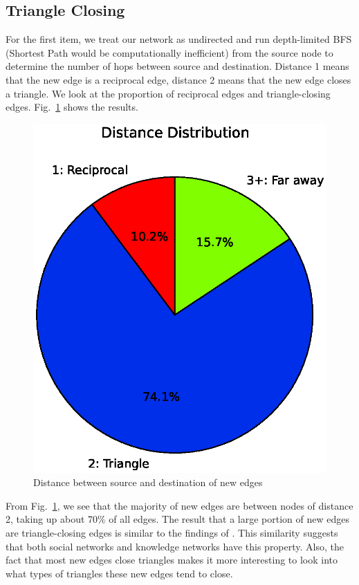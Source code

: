 \documentclass[10pt]{article}
\begin{document}
\begin{multicols}{2}
\subsection{Triangle Closing}
For the first item, we treat our network as undirected and run depth-limited BFS (Shortest Path would be computationally inefficient) from the source node to determine the number of hops between source and destination. Distance 1 means that the new edge is a reciprocal edge, distance 2 means that the new edge closes a triangle. We look at the proportion of reciprocal edges and triangle-closing edges. Fig.~\ref{fig:portion123} shows the results.
\begin{figure}[H]
    \centering
    \includegraphics[scale=0.4]{./graphs/distance_pie.eps}
    \caption{Distance between source and destination of new edges} \label{fig:portion123}
\end{figure}
From Fig.~\ref{fig:portion123}, we see that the majority of new edges are between nodes of distance 2, taking up about 70\% of all edges. The result that a large portion of new edges are triangle-closing edges is similar to the findings of \cite{leskovec2008microscopic}. This similarity suggests that both social networks and knowledge networks have this property. Also, the fact that most new edges close triangles makes it more interesting to look into what types of triangles these new edges tend to close.


\end{multicols}
\end{document}
